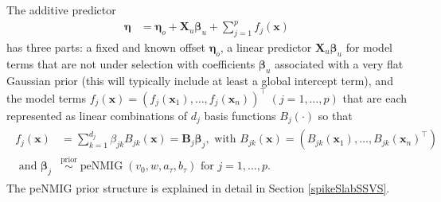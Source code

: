 \documentclass[article, shortnames, nojss, noheadings, notitle]{jss}
\newcommand{\priorsim}{\stackrel{\text{prior}}{\sim}}
\begin{document}
The additive predictor
\begin{align}\label{F:eta}
\bm\eta &= \bm\eta_o + \bm X_u \bm\beta_u + \sum^p_{j=1}f_j(\bm x)
\end{align}
has three parts: a fixed and known offset $\bm\eta_o$,
a linear predictor $\bm X_u \bm\beta_u$ for model terms that are not under selection with coefficients $\bm\beta_u$
associated with a very flat Gaussian prior (this will typically include at least a global intercept term), and the model terms
$f_j(\bm x)=\left(f_j(\bm x_{1}),\ldots,f_j(\bm x_{n})\right)^\top\;(j=1,\dots,p)$ that are each represented as linear combinations of $d_j$ basis functions $B_j(\cdot)$ so that
\begin{align}
\begin{split}
f_j(\bm x) &= \sum_{k=1}^{d_j} \beta_{jk}B_{jk}(\bm x)= \bm B_j \bm \beta_j,  \text{ with } B_{jk}(\bm x)=\left(B_{jk}(\bm x_{1}),\ldots,B_{jk}(\bm x_{n})^\top\right)\\
\text{ and }\bm\beta_j &\priorsim \operatorname{peNMIG}(v_0, w, a_\tau, b_\tau) \text{ for } j=1,\dots,p. \label{F:term}
\end{split}
\end{align}
The peNMIG prior structure is explained in detail in Section \ref{spikeSlabSSVS}.
\end{document}
